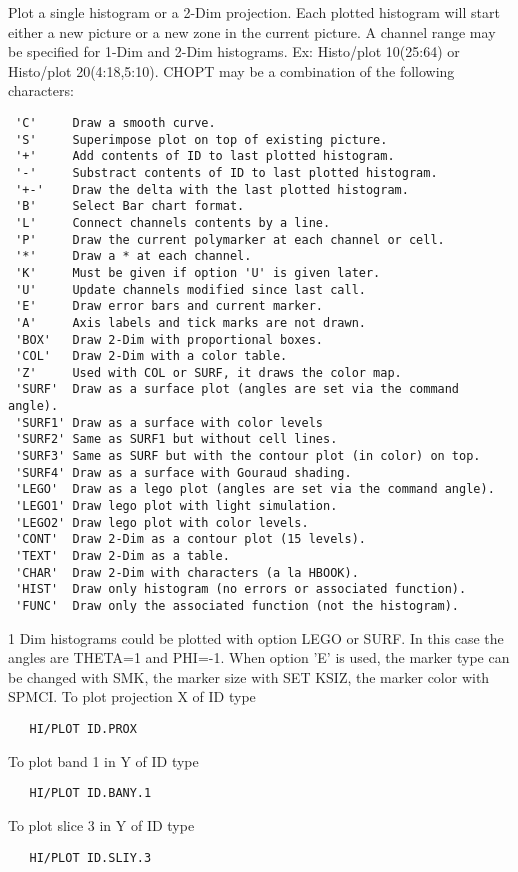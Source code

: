 \BEGARG
{}
\ENDARG
\BEGTEXT
Plot a single histogram or a 2-Dim projection.
Each plotted histogram will start
either a new picture or a new zone in the current picture.
A channel range may be specified for 1-Dim and 2-Dim histograms.
Ex: Histo/plot 10(25:64) or Histo/plot 20(4:18,5:10).
CHOPT may be a combination of the following characters:
\begin{verbatim}
 'C'     Draw a smooth curve.
 'S'     Superimpose plot on top of existing picture.
 '+'     Add contents of ID to last plotted histogram.
 '-'     Substract contents of ID to last plotted histogram.
 '+-'    Draw the delta with the last plotted histogram.
 'B'     Select Bar chart format.
 'L'     Connect channels contents by a line.
 'P'     Draw the current polymarker at each channel or cell.
 '*'     Draw a * at each channel.
 'K'     Must be given if option 'U' is given later.
 'U'     Update channels modified since last call.
 'E'     Draw error bars and current marker.
 'A'     Axis labels and tick marks are not drawn.
 'BOX'   Draw 2-Dim with proportional boxes.
 'COL'   Draw 2-Dim with a color table.
 'Z'     Used with COL or SURF, it draws the color map.
 'SURF'  Draw as a surface plot (angles are set via the command angle).
 'SURF1' Draw as a surface with color levels
 'SURF2' Same as SURF1 but without cell lines.
 'SURF3' Same as SURF but with the contour plot (in color) on top.
 'SURF4' Draw as a surface with Gouraud shading.
 'LEGO'  Draw as a lego plot (angles are set via the command angle).
 'LEGO1' Draw lego plot with light simulation.
 'LEGO2' Draw lego plot with color levels.
 'CONT'  Draw 2-Dim as a contour plot (15 levels).
 'TEXT'  Draw 2-Dim as a table.
 'CHAR'  Draw 2-Dim with characters (a la HBOOK).
 'HIST'  Draw only histogram (no errors or associated function).
 'FUNC'  Draw only the associated function (not the histogram).
\end{verbatim}
1 Dim histograms could be plotted with option LEGO or SURF. In this
case the angles are THETA=1 and PHI=-1.
When option 'E' is used, the marker type can be changed with SMK,
the marker size with SET KSIZ, the marker color with SPMCI.
To plot projection X of ID type
\begin{verbatim}
   HI/PLOT ID.PROX
\end{verbatim}
To plot band 1 in Y of ID type
\begin{verbatim}
   HI/PLOT ID.BANY.1
\end{verbatim}
To plot slice 3 in Y of ID type
\begin{verbatim}
   HI/PLOT ID.SLIY.3
\end{verbatim}
\ENDTEXT

